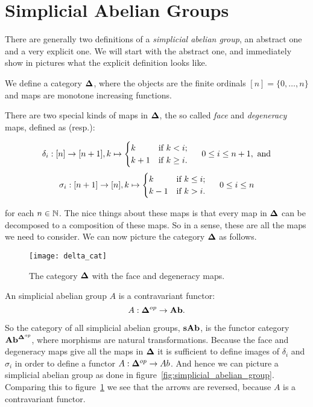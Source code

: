 \section{Simplicial Abelian Groups}
\label{sec:Simplicial Abelian Groups}

There are generally two definitions of a \emph{simplicial abelian group}, an abstract one and a very explicit one. We will start with the abstract one, and immediately show in pictures what the explicit definition looks like.

\begin{definition}
	We define a category $\mathbf{\Delta}$, where the objects are the finite ordinals $[n] = \{0, \dots, n\}$ and maps are monotone increasing functions.
\end{definition}

There are two special kinds of maps in $\mathbf{\Delta}$, the so called \emph{face} and \emph{degeneracy} maps, defined as (resp.):

$$\delta_i: [n] \to [n+1], k \mapsto \begin{cases} k & \text{if } k < i;\\ k+1 & \text{if } k \geq i. \end{cases} \hspace{0.5cm} 0 \leq i \leq n+1, \text{ and}$$
$$\sigma_i: [n+1] \to [n], k \mapsto \begin{cases} k & \text{if } k \leq i;\\ k-1 & \text{if } k > i. \end{cases} \hspace{0.5cm} 0 \leq i \leq n$$

for each $n \in \mathbb{N}$. The nice things about these maps is that every map in $\mathbf{\Delta}$ can be decomposed to a composition of these maps.  So in a sense, these are all the maps we need to consider. We can now picture the category $\mathbf{\Delta}$ as follows.

\begin{figure}[h!]
	\label{fig:delta_cat}
	\texttt{[image: delta\_cat]}
	\caption{The category $\mathbf{\Delta}$ with the face and degeneracy maps.}
\end{figure}

\begin{definition}
	An simplicial abelian group $A$ is a contravariant functor:
	$$A: \mathbf{\Delta}^{op} \to \mathbf{Ab}.$$
\end{definition}

So the category of all simplicial abelian groups, $\mathbf{sAb}$, is the functor category $\mathbf{Ab}^{\mathbf{\Delta}^{op}}$, where morphisms are natural transformations. Because the face and degeneracy maps give all the maps in $\mathbf{\Delta}$ it is sufficient to define images of $\delta_i$ and $\sigma_i$ in order to define a functor $A: \mathbf{\Delta}^{op} \to Ab$. And hence we can picture a simplicial abelian group as done in figure~\ref{fig:simplicial_abelian_group}. Comparing this to figure~\ref{fig:delta_cat} we see that the arrows are reversed, because $A$ is a contravariant functor.


